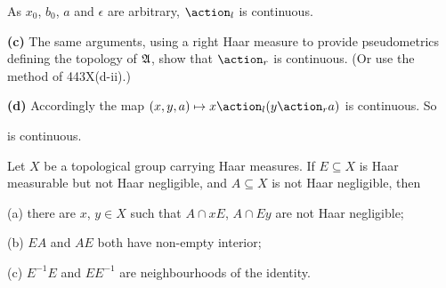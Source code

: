 {As $x_0$, $b_0$, $a$ and $\epsilon$ are arbitrary, $\action_l$ is
continuous.

\medskip

{\bf (c)} The same arguments, using a right Haar measure to provide
pseudometrics defining the topology of $\frak A$, show that $\action_r$
is continuous.   (Or use the method of 443X(d-ii).)

\medskip

{\bf (d)} Accordingly the map $(x,y,a)\mapsto x\action_l(y\action_ra)$
is continuous.   So


\noindent is continuous.
}%

 Let $X$ be a topological group carrying Haar
measures.
If $E\subseteq X$ is Haar measurable but not Haar negligible, and
$A\subseteq X$ is not Haar negligible, then

(a) there are $x$, $y\in X$ such that $A\cap xE$, $A\cap Ey$ are not
Haar negligible;

(b) $EA$ and $AE$ both have non-empty interior;

(c) $E^{-1}E$ and $EE^{-1}$ are neighbourhoods of the identity.

